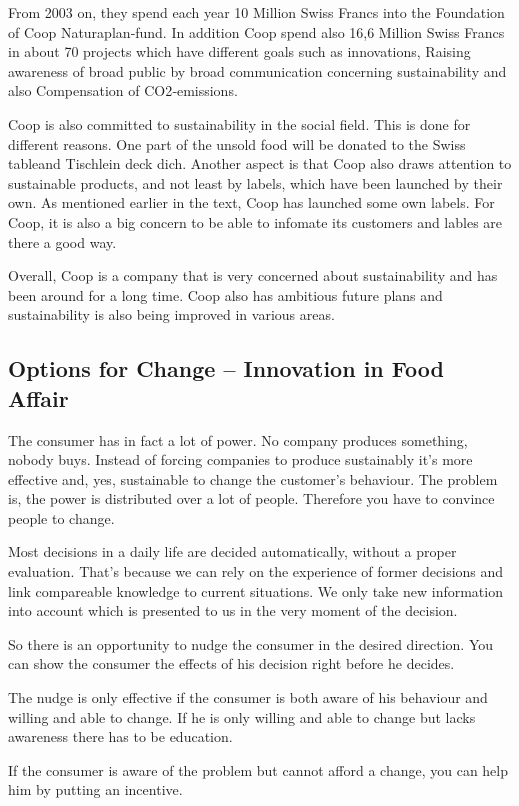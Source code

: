 From 2003 on, they spend each year 10 Million Swiss Francs into the Foundation of Coop Naturaplan‐fund. In addition Coop spend also 16,6 Million Swiss Francs in about 70 projects which have different goals such as innovations, Raising awareness of broad public by broad communication concerning sustainability and also Compensation of CO2‐emissions.

Coop is also committed to sustainability in the social field. This is done for different reasons. One part of the unsold food will be donated to the {}\grqq Swiss table{}\grqq and {}\grqq Tischlein deck dich{}\grqq . Another aspect is that Coop also draws attention to sustainable products, and not least by labels, which have been launched by their own. As mentioned earlier in the text, Coop has launched some own labels.  For Coop, it is also a big concern to be able to infomate its customers and lables are there a good way.

Overall, Coop is a company that is very concerned about sustainability and has been around for a long time. Coop also has ambitious future plans and sustainability is also being improved in various areas.
\subsection{Options
	for
	Change
	– Innovation
	in
	Food
	Affair}

The consumer has in fact a lot of power. No company produces something, nobody buys.  Instead of
forcing companies to produce sustainably it's more effective and, yes, sustainable to change the
customer's behaviour.  The problem is, the power is distributed over a lot of people. Therefore you
have to convince people to change.

Most decisions in a daily life are decided automatically, without a proper evaluation. That's
because we can  rely on the experience of former decisions and link compareable knowledge to current
situations. We only take new information into account which is presented to us in the very moment of
the decision.

So there is an opportunity to nudge the consumer in the desired direction. You can show the consumer
the effects of his decision right before he decides.

The nudge is only effective if the consumer is both aware of his behaviour and willing and able to
change. If he is only willing and able to change but lacks awareness there has to be education.

If the consumer is aware of the problem but cannot afford a change, you can help him by putting an
incentive.

